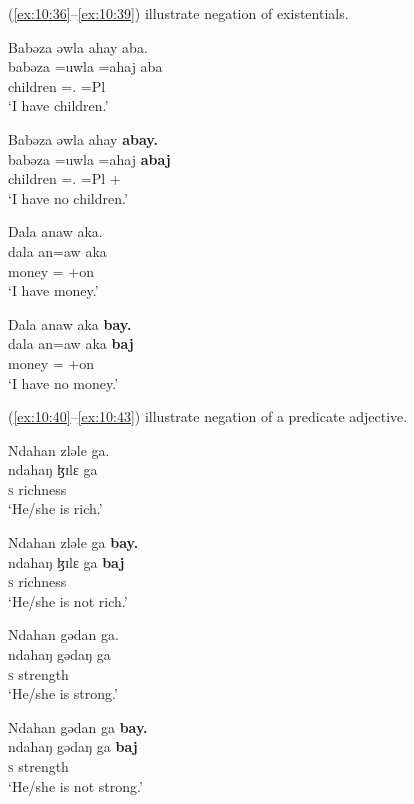 (\ref{ex:10:36}--\ref{ex:10:39}) illustrate negation of existentials. 

\ea \label{ex:10:36}
Babəza  əwla  ahay  aba. \\
\gll  babəza  =uwla    =ahaj  aba \\
      children  ={\oneS}.{\POSS}  =Pl  {\EXT}\\
\glt  ‘I have children.’            
\z

\ea \label{ex:10:37}
Babəza  əwla  ahay  \textbf{abay.}\\
\gll  babəza  =uwla    =ahaj  \textbf{abaj}\\
      children  ={\oneS}.{\POSS}  =Pl  {\EXT}+{\NEG}\\
\glt  ‘I have no children.’  
\z

\ea \label{ex:10:38}
Dala  anaw  aka. \\
\gll  dala   an=aw     aka\\
      money  {\DAT}={\oneS}  {\EXT}+on \\
\glt  ‘I have money.’           
\z

\ea \label{ex:10:39}
Dala  anaw  aka \textbf{bay.}\\
\gll  dala   an=aw     aka \textbf{baj}\\
      money  {\DAT}={\oneS}  {\EXT}+on    {\NEG}\\
\glt  ‘I have no money.’
\z

(\ref{ex:10:40}--\ref{ex:10:43}) illustrate negation of a predicate adjective. 

\ea \label{ex:10:40}
Ndahan  zləle  ga.\\
\gll  ndahaŋ   ɮɪlɛ   ga\\
      \textsc{s}    richness  {\ADJ}\\
\glt  ‘He/she is rich.’           
\z

\ea \label{ex:10:41}
Ndahan  zləle  ga  \textbf{bay.}\\
\gll  ndahaŋ  ɮɪlɛ   ga   \textbf{baj}\\
      \textsc{s}    richness  {\ADJ}  {\NEG}\\
\glt  ‘He/she is not rich.’
\z

\ea \label{ex:10:42}
Ndahan  gədan  ga.\\
\gll  ndahaŋ   gədaŋ   ga\\
      \textsc{s}    strength  {\ADJ}\\
\glt  ‘He/she is strong.’            
\z

\ea \label{ex:10:43}
Ndahan  gədan  ga  \textbf{bay.}\\
\gll  ndahaŋ   gədaŋ   ga   \textbf{baj}\\
      \textsc{s}    strength  {\ADJ}  {\NEG}\\
\glt  ‘He/she is not strong.’
\z

